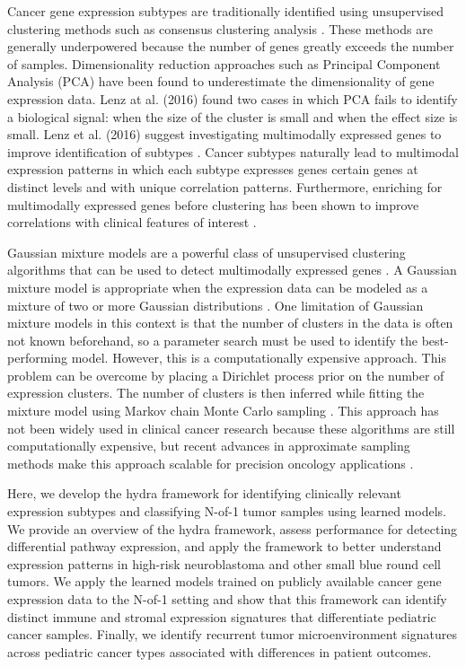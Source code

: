 \documentclass[10pt,letterpaper]{article}
\begin{document}
Cancer gene expression subtypes are traditionally identified using unsupervised clustering methods such as consensus clustering analysis \cite{oyeladeClusteringAlgorithmsTheir2016,johnM3CMonteCarlo2018,wilkersonConsensusClusterPlusClassDiscovery2010}. These methods are generally underpowered because the number of genes greatly exceeds the number of samples. Dimensionality reduction approaches such as Principal Component Analysis (PCA) have been found to underestimate the dimensionality of gene expression data. Lenz at al. (2016) found two cases in which PCA fails to identify a biological signal: when the size of the cluster is small and when the effect size is small. Lenz et al. (2016) suggest investigating multimodally expressed genes to improve identification of subtypes \cite{lenzPrincipalComponentsAnalysis2016}. Cancer subtypes naturally lead to multimodal expression patterns in which each subtype expresses genes certain genes at distinct levels and with unique correlation patterns. Furthermore, enriching for multimodally expressed genes before clustering has been shown to improve correlations with clinical features of interest \cite{yiliMultimodalityCriterionFeature2005}.

Gaussian mixture models are a powerful class of unsupervised clustering algorithms that can be used to detect multimodally expressed genes \cite{ghoshMixtureModelsAssessing2004,dahlModelBasedClusteringExpression2006,kimVariableSelectionClustering2006}. A Gaussian mixture model is appropriate when the expression data can be modeled as a mixture of two or more Gaussian distributions \cite{gelman2013bayesian}. One limitation of Gaussian mixture models in this context is that the number of clusters in the data is often not known beforehand, so a parameter search must be used to identify the best-performing model. However, this is a computationally expensive approach. This problem can be overcome by placing a Dirichlet process prior on the number of expression clusters. The number of clusters is then inferred while fitting the mixture model using Markov chain Monte Carlo sampling \cite{gelman2013bayesian}. This approach has not been widely used in clinical cancer research because these algorithms are still computationally expensive, but recent advances in approximate sampling methods make this approach scalable for precision oncology applications \cite{thallBayesianNonparametricStatistics2017}. 

Here, we develop the hydra framework for identifying clinically relevant expression subtypes and classifying N-of-1 tumor samples using learned models. We provide an overview of the hydra framework, assess performance for detecting differential pathway expression, and apply the framework to better understand expression patterns in high-risk neuroblastoma and other small blue round cell tumors. We apply the learned models trained on publicly available cancer gene expression data to the N-of-1 setting and show that this framework can identify distinct immune and stromal expression signatures that differentiate pediatric cancer samples. Finally, we identify recurrent tumor microenvironment signatures across pediatric cancer types associated with differences in patient outcomes.
  
\end{document}
